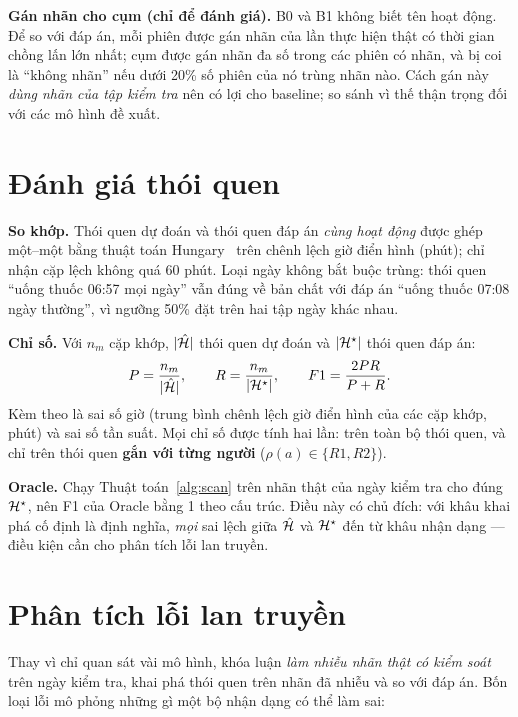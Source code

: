 \textbf{Gán nhãn cho cụm (chỉ để đánh giá).} B0 và B1 không biết tên hoạt động. Để so với đáp án, mỗi
phiên được gán nhãn của lần thực hiện thật có thời gian chồng lấn lớn nhất; cụm được gán nhãn đa số
trong các phiên có nhãn, và bị coi là ``không nhãn'' nếu dưới 20\% số phiên của nó trùng nhãn nào.
Cách gán này \emph{dùng nhãn của tập kiểm tra} nên có lợi cho baseline; so sánh vì thế thận trọng đối
với các mô hình đề xuất.

\section{Đánh giá thói quen}
\label{sec:m-eval}

\textbf{So khớp.} Thói quen dự đoán và thói quen đáp án \emph{cùng hoạt động} được ghép một--một bằng
thuật toán Hungary~\cite{kuhn1955hungarian} trên chênh lệch giờ điển hình (phút); chỉ nhận cặp lệch
không quá 60 phút. Loại ngày không bắt buộc trùng: thói quen ``uống thuốc 06:57 mọi ngày'' vẫn đúng về
bản chất với đáp án ``uống thuốc 07:08 ngày thường'', vì ngưỡng 50\% đặt trên hai tập ngày khác nhau.

\textbf{Chỉ số.} Với $n_m$ cặp khớp, $|\hat{\mathcal{H}}|$ thói quen dự đoán và $|\mathcal{H}^\star|$ thói quen đáp án:
\begin{equation}
  P = \frac{n_m}{|\hat{\mathcal{H}}|}, \qquad R = \frac{n_m}{|\mathcal{H}^\star|}, \qquad F1 = \frac{2PR}{P+R}.
\end{equation}
Kèm theo là sai số giờ (trung bình chênh lệch giờ điển hình của các cặp khớp, phút) và sai số tần suất.
Mọi chỉ số được tính hai lần: trên toàn bộ thói quen, và chỉ trên thói quen \textbf{gắn với từng người}
($\rho(a) \in \{R1, R2\}$).

\textbf{Oracle.} Chạy Thuật toán~\ref{alg:scan} trên nhãn thật của ngày kiểm tra cho đúng $\mathcal{H}^\star$,
nên F1 của Oracle bằng 1 theo cấu trúc. Điều này có chủ đích: với khâu khai phá cố định là định nghĩa,
\emph{mọi} sai lệch giữa $\hat{\mathcal{H}}$ và $\mathcal{H}^\star$ đến từ khâu nhận dạng --- điều kiện cần cho phân
tích lỗi lan truyền.

\section{Phân tích lỗi lan truyền}
\label{sec:m-prop}

Thay vì chỉ quan sát vài mô hình, khóa luận \emph{làm nhiễu nhãn thật có kiểm soát} trên ngày kiểm tra,
khai phá thói quen trên nhãn đã nhiễu và so với đáp án. Bốn loại lỗi mô phỏng những gì một bộ nhận dạng
có thể làm sai:

